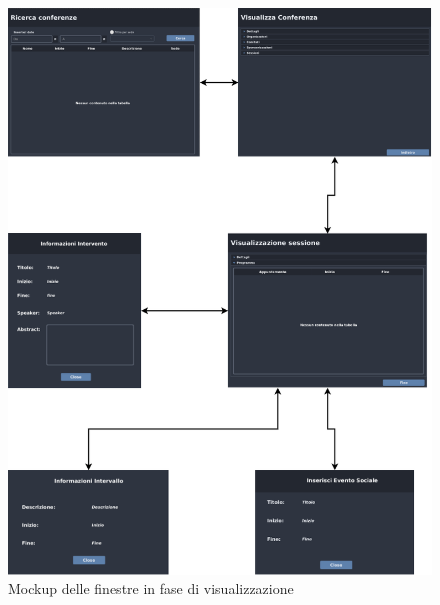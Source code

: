 \begin{figure}
	\centering
	\includegraphics[scale=0.5]{Immagini/Mockup/View/Visualizza_Flow.png}
	\caption{Mockup delle finestre in fase di visualizzazione}
\end{figure}

